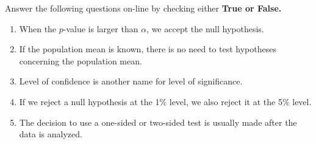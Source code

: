 \item Answer the following questions on-line by checking either \textbf{True or False.}
\begin{enumerate}
\item When the $p$-value is larger than $\alpha$, we accept the null hypothesis. 
\item If the population mean is known, there is no need to test hypotheses concerning the population mean.  
\item Level of confidence is another name for level of significance. 
\item If we reject a null hypothesis at the 1\% level, we also reject it at the 5\% level.  
\item The decision to use a one-sided or two-sided test is usually made after the data is analyzed. 
\end{enumerate}
